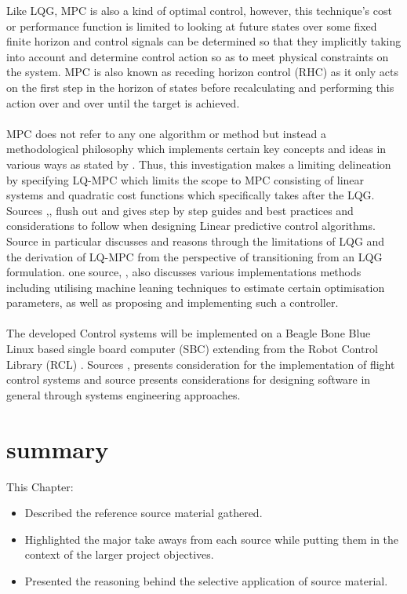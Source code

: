 \documentclass[12pt,a4paper,twoside]{report}
\begin{document}
				Like LQG, MPC is also a kind of optimal control, however, this technique’s cost or performance function is limited to looking at future states over some fixed finite horizon and control signals can be determined so that they implicitly taking into account and determine control action so as to meet physical constraints on the system. MPC is also known as receding horizon control (RHC) as it only acts on the first step in the horizon of states before recalculating and performing this action over and over until the target is achieved.
				\\ \\
				MPC does not refer to any one algorithm or method but instead a methodological philosophy which implements certain key concepts and ideas in various ways as stated by \cite{26}. Thus, this investigation makes a limiting delineation by specifying LQ-MPC which limits the scope to MPC consisting of linear systems and quadratic cost functions which specifically takes after the LQG.
				\\
				Sources \cite{25},\cite{26},\cite{27} flush out and gives step by step guides and best practices and considerations to follow when designing Linear predictive control algorithms. Source \cite{25} in particular discusses and reasons through the limitations of LQG and the derivation of LQ-MPC from the perspective of transitioning from an LQG formulation. one source, \cite{28}, also discusses various implementations methods including utilising machine leaning techniques to estimate certain optimisation parameters, as well as proposing and implementing such a controller.
				\\ \\
				The developed Control systems will be implemented on a Beagle Bone Blue Linux based single board computer (SBC) extending from the Robot Control Library (RCL) \cite{31}. Sources \cite{19},\cite{29} presents consideration for the implementation of flight control systems and source \cite{30} presents considerations for designing software in general through systems engineering approaches.
			
			\section{summary}	
			
				This Chapter:
				\\
				\begin{itemize}
					\item 
						Described the reference source material gathered.
					\item 
						Highlighted the major take aways from each source while putting them in the context of the larger project objectives.
					\item
						Presented the reasoning behind the selective application of source material.
				\end{itemize}
		
\end{document}
